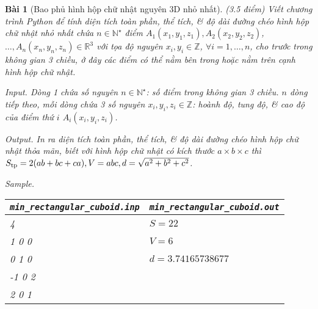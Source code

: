 \documentclass{article}
\newtheorem{baitoan}{Bài}
\begin{document}
\begin{baitoan}[Bao phủ hình hộp chữ nhật nguyên 3D nhỏ nhất]
	{\rm(3.5 điểm)} Viết chương trình Python để tính diện tích toàn phần, thể tích, \& độ dài đường chéo hình hộp chữ nhật nhỏ nhất chứa $n\in\mathbb{N}^\star$ điểm $A_1(x_1,y_1,z_1),A_2(x_2,y_2,z_2)$, $\ldots,A_n(x_n,y_n,z_n)\in\mathbb{R}^3$ với tọa độ nguyên $x_i,y_i\in\mathbb{Z}$, $\forall i = 1,\ldots,n$, cho trước trong không gian 3 chiều, ở đây các điểm có thể nằm bên trong hoặc nằm trên cạnh hình hộp chữ nhật.
	\item {\sf Input.} Dòng 1 chứa số nguyên $n\in\mathbb{N}^\star$: số điểm trong không gian 3 chiều. $n$ dòng tiếp theo, mỗi dòng chứa 3 số nguyên $x_i,y_i,z_i\in\mathbb{Z}$: hoành độ, tung độ, \& cao độ của điểm thứ $i$ $A_i(x_i,y_i,z_i)$.
	\item {\sf Output.} In ra diện tích toàn phần, thể tích, \& độ dài đường chéo hình hộp chữ nhật thỏa mãn, biết với hình hộp chữ nhật có kích thước $a\times b\times c$ thì $S_{\rm tp} = 2(ab + bc + ca),V = abc,d = \sqrt{a^2 + b^2 + c^2}$.
	\item {\sf Sample.}
	\begin{table}[H]
		\centering
		\begin{tabular}{|l|l|}
			\hline
			\verb|min_rectangular_cuboid.inp| & \verb|min_rectangular_cuboid.out| \\
			\hline
			4 & $S = 22$ \\
			1 0 0& $V = 6$ \\
			0 1 0 & $d = 3.74165738677 $ \\
			-1 0 2 & \\
			2 0 1 & \\
			\hline
		\end{tabular}
	\end{table}
\end{baitoan}


\printbibliography[heading=bibintoc]
\end{document}
